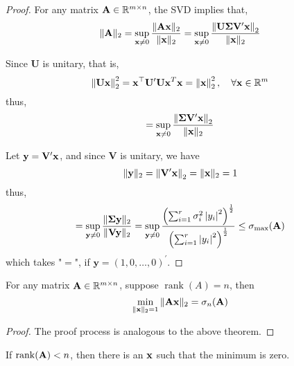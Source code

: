 \begin{proof}
	For any matrix ${\bf A}\in{\mathbb R}^{m\times n}$, the SVD implies that,
	\begin{equation*}
		\|{\bf A}\|_{2}=\sup_{{\bf x}\neq 0}\frac{\|{\bf A}{\bf x}\|_{2}}{\|{\bf x}\|_{2}}=\sup_{{\bf x}\neq 0}\frac{\left\|\mathbf{U}\boldsymbol{\Sigma}\mathbf{V}^{\prime}{\bf x}\right\|_{2}}{\|{\bf x}\|_{2}}
	\end{equation*}

	Since $\mathbf{U}$ is unitary, that is,
	\begin{equation*}
		\left\|\mathbf{U}{\bf x}\right\|_{2}^{2}={\bf x}^{\top}\mathbf{U}^{\prime}\mathbf{U}{\bf x}^{T}{\bf x}=\left\|{\bf x}\right\|_{2}^{2},\quad\forall{\bf x}\in{\mathbb R}^{m}
	\end{equation*}
	thus,
	\begin{equation*}
		=\sup_{{\bf x}\neq 0}\frac{\left\|\boldsymbol{\Sigma}\mathbf{V}^{\prime}{\bf x}\right\|_{2}}{\|{\bf x}\|_{2}}
	\end{equation*}

	Let $\mathbf{y}=\mathbf{V}^{\prime}{\bf x}$, and since $\mathbf{V}$ is unitary, we have
	\begin{equation*}
		\|\mathbf{y}\|_{2}=\left\|\mathbf{V}^{\prime}{\bf x}\right\|_{2}=\|{\bf x}\|_{2}=1
	\end{equation*}
	thus,
	\begin{equation*}
		=\sup_{\mathbf{y}\neq 0}\frac{\|\boldsymbol{\Sigma}\mathbf{y}\|_{2}}{\|\mathbf{V}\mathbf{y}\|_{2}}=\sup_{\mathbf{y}\neq 0}\frac{\left(\sum_{i=1}^{r}\sigma_{i}^{2}\left|y_{i}\right|^{2}\right)^{\frac{1}{2}}}{\left(\sum_{i=1}^{r}\left|y_{i}\right|^{2}\right)^{\frac{1}{2}}}\leq\sigma_{\max}({\bf A})
	\end{equation*}
	which takes "$=$", if $\boldsymbol{y}=\left(1,0,\ldots,0\right)^{\prime}$.
\end{proof}

\begin{theorem}
	For any matrix ${\bf A}\in{\mathbb R}^{m\times n}$, suppose $\operatorname{rank}(A)=n$, then
	\begin{equation}
		\min_{\|{\bf x}\|_{2}=1}\|{\bf A}{\bf x}\|_{2}=\sigma_{n}({\bf A})
	\end{equation}
\end{theorem}

\begin{proof}
	The proof process is analogous to the above theorem.
\end{proof}

\begin{remark}
	If $\operatorname{rank}({\bf A})<n$, then there is an ${\bf x}$ such that the minimum is zero.
\end{remark}
